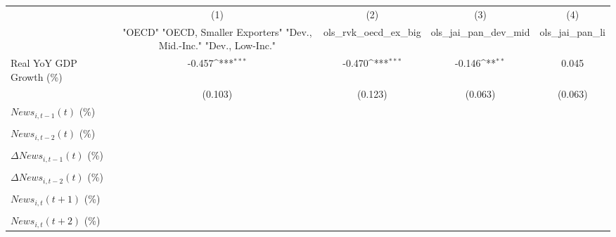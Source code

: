 {
\def\sym#1{\ifmmode^{#1}\else\(^{#1}\)\fi}
\begin{tabular}{l*{4}{c}}
\toprule
                    &\multicolumn{1}{c}{(1)}&\multicolumn{1}{c}{(2)}&\multicolumn{1}{c}{(3)}&\multicolumn{1}{c}{(4)}\\
                    &\multicolumn{1}{c}{ "OECD" "OECD, Smaller Exporters" "Dev., Mid.-Inc." "Dev., Low-Inc."}&\multicolumn{1}{c}{ols_rvk_oecd_ex_big}&\multicolumn{1}{c}{ols_jai_pan_dev_mid}&\multicolumn{1}{c}{ols_jai_pan_li}\\
\midrule
Real YoY GDP Growth (\%)&      -0.457\sym{***}&      -0.470\sym{***}&      -0.146\sym{**} &       0.045         \\
                    &     (0.103)         &     (0.123)         &     (0.063)         &     (0.063)         \\
\addlinespace
$ News_{i,t-1}(t)$ (\%)&                     &                     &                     &                     \\
                    &                     &                     &                     &                     \\
\addlinespace
$ News_{i,t-2}(t)$ (\%)&                     &                     &                     &                     \\
                    &                     &                     &                     &                     \\
\addlinespace
$ \Delta News_{i,t-1}(t)$ (\%)&                     &                     &                     &                     \\
                    &                     &                     &                     &                     \\
\addlinespace
$ \Delta News_{i,t-2}(t)$ (\%)&                     &                     &                     &                     \\
                    &                     &                     &                     &                     \\
\addlinespace
$ News_{i,t}(t+1)$ (\%)&                     &                     &                     &                     \\
                    &                     &                     &                     &                     \\
\addlinespace
$ News_{i,t}(t+2)$ (\%)&                     &                     &                     &                     \\

\end{tabular}}
